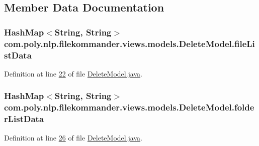 \subsection{Member Data Documentation}
\hypertarget{classcom_1_1poly_1_1nlp_1_1filekommander_1_1views_1_1models_1_1_delete_model_a3ff23db5a93631b8e56d9797fad7a866}{
\subsubsection[{file\-List\-Data}]{\setlength{\rightskip}{0pt plus 5cm}Hash\-Map$<$String, String$>$ com.\-poly.\-nlp.\-filekommander.\-views.\-models.\-Delete\-Model.\-file\-List\-Data\hspace{0.3cm}{\ttfamily [private]}}}\label{classcom_1_1poly_1_1nlp_1_1filekommander_1_1views_1_1models_1_1_delete_model_a3ff23db5a93631b8e56d9797fad7a866}


Definition at line \hyperlink{L22}{22} of file \hyperlink{}{Delete\-Model.\-java}.

\hypertarget{classcom_1_1poly_1_1nlp_1_1filekommander_1_1views_1_1models_1_1_delete_model_a4152e1b4fc47f32d0bcc2793da662ab9}{
\subsubsection[{folder\-List\-Data}]{\setlength{\rightskip}{0pt plus 5cm}Hash\-Map$<$String, String$>$ com.\-poly.\-nlp.\-filekommander.\-views.\-models.\-Delete\-Model.\-folder\-List\-Data\hspace{0.3cm}{\ttfamily [private]}}}\label{classcom_1_1poly_1_1nlp_1_1filekommander_1_1views_1_1models_1_1_delete_model_a4152e1b4fc47f32d0bcc2793da662ab9}


Definition at line \hyperlink{L26}{26} of file \hyperlink{}{Delete\-Model.\-java}.

